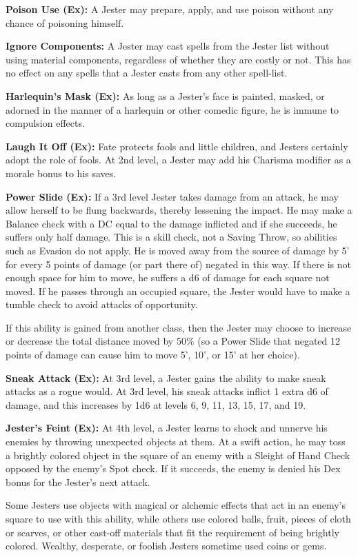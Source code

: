 \documentclass[10pt]{article}
\newcommand{\ability}[2]{\smallskip \noindent \textbf{#1} #2}
\begin{document}
\ability{Poison Use (Ex):}{A Jester may prepare, apply, and use poison without any chance of poisoning himself.}

\ability{Ignore Components:}{A Jester may cast spells from the Jester list without using material components, regardless of whether they are costly or not. This has no effect on any spells that a Jester casts from any other spell-list.}

\ability{Harlequin's Mask (Ex):}{As long as a Jester's face is painted, masked, or adorned in the manner of a harlequin or other comedic figure, he is immune to compulsion effects.}

\ability{Laugh It Off (Ex):}{Fate protects fools and little children, and Jesters certainly adopt the role of fools. At 2nd level, a Jester may add his Charisma modifier as a morale bonus to his saves.}

\ability{Power Slide (Ex):}{If a 3rd level Jester takes damage from an attack, he may allow herself to be flung backwards, thereby lessening the impact. He may make a Balance check with a DC equal to the damage inflicted and if she succeeds, he suffers only half damage. This is a skill check, not a Saving Throw, so abilities such as Evasion do not apply. He is moved away from the source of damage by 5' for every 5 points of damage (or part there of) negated in this way. If there is not enough space for him to move, he suffers a d6 of damage for each square not moved. If he passes through an occupied square, the Jester would have to make a tumble check to avoid attacks of opportunity. \smallskip

If this ability is gained from another class, then the Jester may choose to increase or decrease the total distance moved by 50\% (so a Power Slide that negated 12 points of damage can cause him to move 5', 10', or 15' at her choice).}

\ability{Sneak Attack (Ex):}{At 3rd level, a Jester gains the ability to make sneak attacks as a rogue would. At 3rd level, his sneak attacks inflict 1 extra d6 of damage, and this increases by 1d6 at levels 6, 9, 11, 13, 15, 17, and 19.}

\ability{Jester's Feint (Ex):}{At 4th level, a Jester learns to shock and unnerve his enemies by throwing unexpected objects at them. At a swift action, he may toss a brightly colored object in the square of an enemy with a Sleight of Hand Check opposed by the enemy's Spot check. If it succeeds, the enemy is denied his Dex bonus for the Jester's next attack.

Some Jesters use objects with magical or alchemic effects that act in an enemy's square to use with this ability, while others use colored balls, fruit, pieces of cloth or scarves, or other cast-off materials that fit the requirement of being brightly colored. Wealthy, desperate, or foolish Jesters sometime used coins or gems.}
\end{document}
